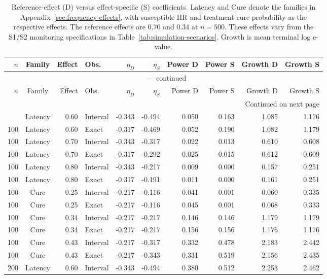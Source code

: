 \documentclass[12pt]{article}
\theoremstyle{definition}
\theoremstyle{remark}
\begin{document}
\begin{longtable}{rcrlrrrrrr}
\caption{Reference-effect (D) versus effect-specific (S) coefficients. Latency and Cure denote the families in Appendix~\ref{sec:frequency-effects}, with susceptible HR and treatment cure probability as the respective effects. The reference effects are 0.70 and 0.34 at $n=500$. These effects vary from the S1/S2 monitoring specifications in Table~\ref{tab:simulation-scenarios}. Growth is mean terminal log e-value.}\label{tab:effect-calibration}\\
\toprule
$n$ & Family & Effect & Obs. & $\eta_D$ & $\eta_S$ & Power D & Power S & Growth D & Growth S \\
\midrule
\endfirsthead
\multicolumn{10}{c}{\tablename\ \thetable{} --- continued}\\
\toprule
$n$ & Family & Effect & Obs. & $\eta_D$ & $\eta_S$ & Power D & Power S & Growth D & Growth S \\
\midrule
\endhead
\midrule
\multicolumn{10}{r}{Continued on next page}\\
\endfoot
\bottomrule
\endlastfoot
100 & Latency & 0.60 & Interval & -0.343 & -0.494 & 0.050 & 0.163 & 1.085 & 1.176 \\
100 & Latency & 0.60 & Exact & -0.317 & -0.469 & 0.052 & 0.190 & 1.082 & 1.179 \\
100 & Latency & 0.70 & Interval & -0.343 & -0.317 & 0.022 & 0.013 & 0.610 & 0.608 \\
100 & Latency & 0.70 & Exact & -0.317 & -0.292 & 0.025 & 0.015 & 0.612 & 0.609 \\
100 & Latency & 0.80 & Interval & -0.343 & -0.217 & 0.009 & 0.000 & 0.157 & 0.251 \\
100 & Latency & 0.80 & Exact & -0.317 & -0.191 & 0.011 & 0.000 & 0.161 & 0.251 \\
100 & Cure & 0.25 & Interval & -0.217 & -0.116 & 0.041 & 0.001 & 0.060 & 0.335 \\
100 & Cure & 0.25 & Exact & -0.217 & -0.116 & 0.045 & 0.001 & 0.068 & 0.333 \\
100 & Cure & 0.34 & Interval & -0.217 & -0.217 & 0.146 & 0.146 & 1.179 & 1.179 \\
100 & Cure & 0.34 & Exact & -0.217 & -0.217 & 0.156 & 0.156 & 1.176 & 1.176 \\
100 & Cure & 0.43 & Interval & -0.217 & -0.317 & 0.332 & 0.478 & 2.183 & 2.442 \\
100 & Cure & 0.43 & Exact & -0.217 & -0.343 & 0.331 & 0.519 & 2.156 & 2.435 \\
200 & Latency & 0.60 & Interval & -0.343 & -0.494 & 0.380 & 0.512 & 2.253 & 2.462 \\

\end{longtable}
\end{document}
